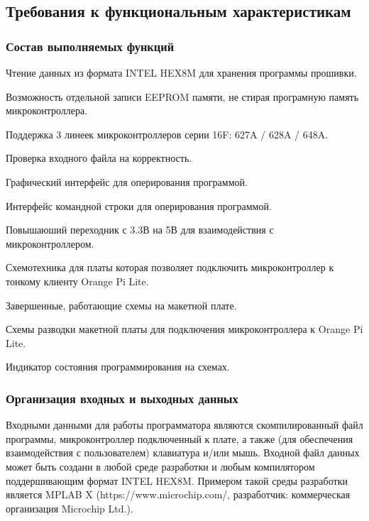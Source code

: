 

\subsection{Требования к функциональным характеристикам}
\subsubsection{Состав выполняемых функций}
\begin{my_enumerate}
\item Чтение данных из формата INTEL HEX8M для хранения программы прошивки.
\item Возможность отдельной записи EEPROM памяти, не стирая програмную память микроконтроллера.
\item Поддержка 3 линеек микроконтроллеров серии 16F: 627A / 628A / 648A.
\item Проверка входного файла на корректность.
\item Графический интерфейс для оперирования программой.
\item Интерфейс командной строки для оперирования программой.
\item Повышаюший переходник с 3.3В на 5В для взаимодействия с микроконтроллером.
\item Схемотехника для платы которая позволяет подключить микроконтроллер к тонкому клиенту Orange Pi Lite.
\item Завершенные, работающие схемы на макетной плате.
\item Схемы разводки макетной платы для подключения микроконтроллера к Orange Pi Lite. 
\item Индикатор состояния программирования на схемах.
\end{my_enumerate}

\subsubsection{Организация входных и выходных данных}
Входными данными для работы программатора являются скомпилированный файл программы, микроконтроллер подключенный к плате, а также (для обеспечения взаимодействия с пользователем) клавиатура и/или мышь. Входной файл данных может быть созданн в любой среде разработки и любым компилятором поддершивающим формат INTEL HEX8M. Примером такой среды разработки является MPLAB X (https://www.microchip.com/, разработчик: коммерческая организация Microchip Ltd.).

